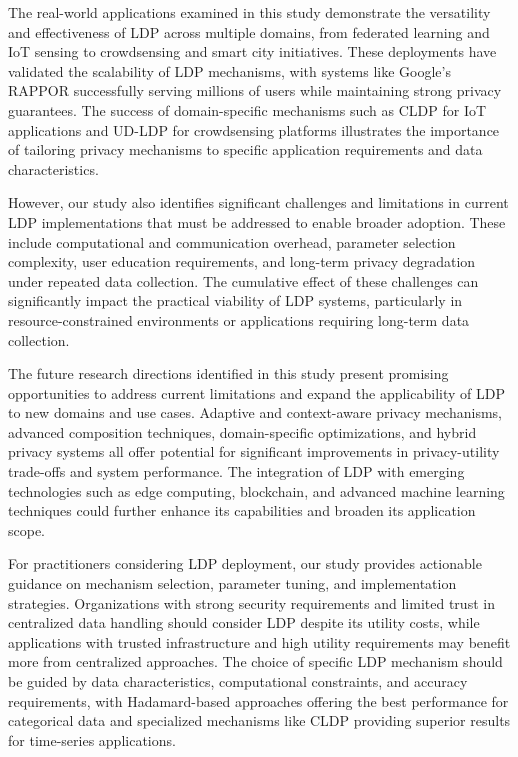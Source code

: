 \documentclass[conference]{IEEEtran}
\begin{document}
The real-world applications examined in this study demonstrate the versatility and effectiveness of LDP across multiple domains, from federated learning and IoT sensing to crowdsensing and smart city initiatives. These deployments have validated the scalability of LDP mechanisms, with systems like Google's RAPPOR successfully serving millions of users while maintaining strong privacy guarantees. The success of domain-specific mechanisms such as CLDP for IoT applications and UD-LDP for crowdsensing platforms illustrates the importance of tailoring privacy mechanisms to specific application requirements and data characteristics.

However, our study also identifies significant challenges and limitations in current LDP implementations that must be addressed to enable broader adoption. These include computational and communication overhead, parameter selection complexity, user education requirements, and long-term privacy degradation under repeated data collection. The cumulative effect of these challenges can significantly impact the practical viability of LDP systems, particularly in resource-constrained environments or applications requiring long-term data collection.

The future research directions identified in this study present promising opportunities to address current limitations and expand the applicability of LDP to new domains and use cases. Adaptive and context-aware privacy mechanisms, advanced composition techniques, domain-specific optimizations, and hybrid privacy systems all offer potential for significant improvements in privacy-utility trade-offs and system performance. The integration of LDP with emerging technologies such as edge computing, blockchain, and advanced machine learning techniques could further enhance its capabilities and broaden its application scope.

For practitioners considering LDP deployment, our study provides actionable guidance on mechanism selection, parameter tuning, and implementation strategies. Organizations with strong security requirements and limited trust in centralized data handling should consider LDP despite its utility costs, while applications with trusted infrastructure and high utility requirements may benefit more from centralized approaches. The choice of specific LDP mechanism should be guided by data characteristics, computational constraints, and accuracy requirements, with Hadamard-based approaches offering the best performance for categorical data and specialized mechanisms like CLDP providing superior results for time-series applications.
\end{document}
